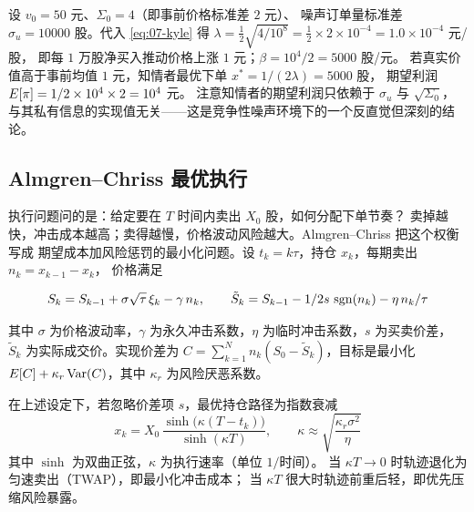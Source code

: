 \begin{example}\label{ex:07-kyle}
设 $v_0 = 50$ 元、$\Sigma_0 = 4$（即事前价格标准差 $2$ 元）、
噪声订单量标准差 $\sigma_u = 10000$ 股。代入 \cref{eq:07-kyle} 得
$\lambda = \frac{1}{2}\sqrt{4/10^{8}} = \frac{1}{2}\times 2\times 10^{-4} = 1.0\times 10^{-4}$ 元/股，
即每 $1$ 万股净买入推动价格上涨 $1$ 元；$\beta = 10^{4}/2 = 5000$ 股/元。
若真实价值高于事前均值 $1$ 元，知情者最优下单 $x^{*} = 1/(2\lambda) = 5000$ 股，
期望利润 $E[\pi] = 1/2\times 10^{4}\times 2 = 10^{4}$ 元。
注意知情者的期望利润只依赖于 $\sigma_u$ 与 $\sqrt{\Sigma_0}$，
与其私有信息的实现值无关——这是竞争性噪声环境下的一个反直觉但深刻的结论。
\end{example}

\subsection{Almgren--Chriss 最优执行}

执行问题问的是：给定要在 $T$ 时间内卖出 $X_0$ 股，如何分配下单节奏？
卖掉越快，冲击成本越高；卖得越慢，价格波动风险越大。Almgren--Chriss 把这个权衡写成
期望成本加风险惩罚的最小化问题。设 $t_k = k\tau$，持仓 $x_k$，每期卖出 $n_k = x_{k-1} - x_k$，
价格满足

\begin{equation}
  S_k = S_{k-1} + \sigma\sqrt{\tau}\,\xi_k - \gamma\, n_k, \qquad
  \tilde{S}_k = S_{k-1} - 1/2s\,\operatorname{sgn}(n_k) - \eta\,n_k/\tau
  \label{eq:07-acexec}
\end{equation}

其中 $\sigma$ 为价格波动率，$\gamma$ 为永久冲击系数，$\eta$ 为临时冲击系数，$s$ 为买卖价差，
$\tilde{S}_k$ 为实际成交价。实现价差为
$C = \sum_{k=1}^{N} n_k (S_0 - \tilde{S}_k)$，目标是最小化
$E[C] + \kappa_r \operatorname{Var}(C)$，其中 $\kappa_r$ 为风险厌恶系数。

\begin{theorem}[线性冲击下的最优执行轨迹]\label{thm:07-ac}
在上述设定下，若忽略价差项 $s$，最优持仓路径为指数衰减
\begin{equation}
  x_k = X_0\,\frac{\sinh\!\big(\kappa (T - t_k)\big)}{\sinh(\kappa T)}, \qquad
  \kappa \approx \sqrt{\frac{\kappa_r \sigma^{2}}{\eta}}
  \label{eq:07-actraj}
\end{equation}
其中 $\sinh$ 为双曲正弦，$\kappa$ 为执行速率（单位 $1/$时间）。
当 $\kappa T \to 0$ 时轨迹退化为匀速卖出（TWAP），即最小化冲击成本；
当 $\kappa T$ 很大时轨迹前重后轻，即优先压缩风险暴露。
\end{theorem}

